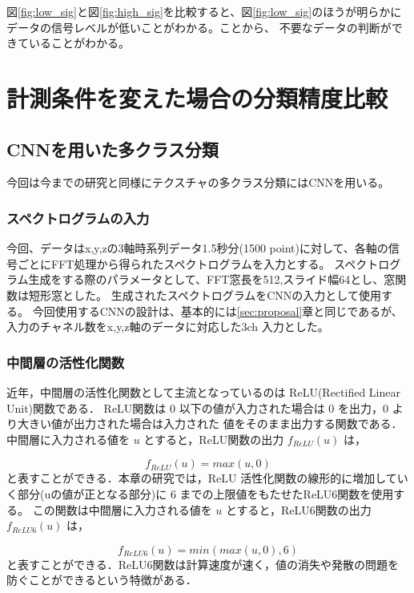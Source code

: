 図\ref{fig:low_sig}と図\ref{fig:high_sig}を比較すると、図\ref{fig:low_sig}のほうが明らかにデータの信号レベルが低いことがわかる。ことから、
不要なデータの判断ができていることがわかる。

\section{計測条件を変えた場合の分類精度比較}
	\subsection{CNNを用いた多クラス分類}
		今回は今までの研究と同様にテクスチャの多クラス分類にはCNNを用いる。

		\subsubsection{スペクトログラムの入力}
			今回、データはx,y,zの3軸時系列データ1.5秒分(1500 point)に対して、各軸の信号ごとにFFT処理から得られたスペクトログラムを入力とする。
			スペクトログラム生成をする際のパラメータとして、FFT窓長を512,スライド幅64とし、窓関数は短形窓とした。
			生成されたスペクトログラムをCNNの入力として使用する。
			今回使用するCNNの設計は、基本的には\ref{sec:proposal}章と同じであるが、入力のチャネル数をx,y,z軸のデータに対応した3ch
			入力とした。

		\subsubsection{中間層の活性化関数}
			近年，中間層の活性化関数として主流となっているのは ReLU(Rectified Linear Unit)関数である．
			ReLU関数は 0 以下の値が入力された場合は 0 を出力，0 より大きい値が出力された場合は入力された
			値をそのまま出力する関数である．
			中間層に入力される値を $u$ とすると，ReLU関数の出力 $f_{ReLU}(u)$ は，
			
			\begin{equation}
			f_{ReLU}(u) = max(u,0)
			\label{f_relu}
			\end{equation}
			と表すことができる．本章の研究では，ReLU 活性化関数の線形的に増加していく部分(uの値が正となる部分)に
			6 までの上限値をもたせたReLU6関数を使用する。
			この関数は中間層に入力される値を $u$ とすると，ReLU6関数の出力 $f_{ReLU6}(u)$ は，
			
			\begin{equation}
			f_{ReLU6}(u) = min(max(u,0),6)
			\label{f_relu}
			\end{equation}
			と表すことができる．ReLU6関数は計算速度が速く，値の消失や発散の問題を防ぐことができるという特徴がある\cite{tensorflow}．
		

